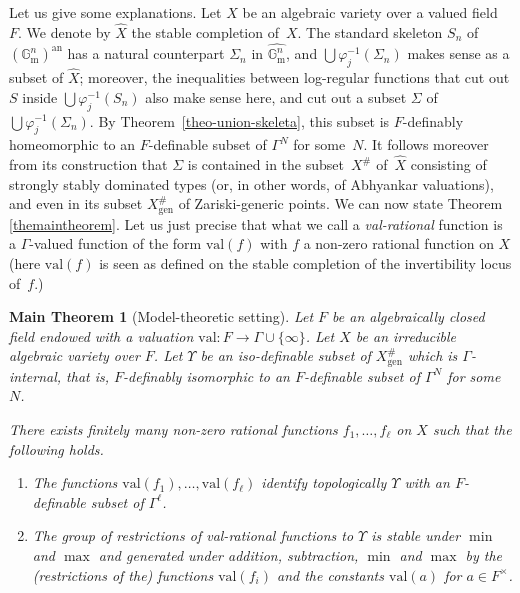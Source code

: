 \documentclass[JEP,XML,SOM,Unicode,ThmDefs,NoEqCountersInSection,published]{cedram}
\newcommand{\an}{^{\mathrm{an}}}
\newcommand{\val}{\mathrm{val}}
\newcommand{\gm}{\bG_{\mathrm m}}
\newcommand{\bG}{\mathbb G}
\let\phi\varphi
\theoremstyle{plain}
\newtheorem*{mtheo}{Main Theorem}
\theoremstyle{definition}
\begin{document}
Let us give some explanations. Let $X$ be an algebraic variety over a valued field~$F$.
We denote by $\widehat X$ the stable completion
of~$X$. The standard skeleton $S_n$ of $(\gm^n)\an$
has a natural counterpart $\Sigma_n$
in $\widehat{\gm^n}$,
and $\bigcup \phi_j^{-1}(\Sigma_n)$
makes sense as a subset of $\widehat X$;
moreover, the inequalities between log-regular functions
that cut out $S$ inside $\bigcup \phi_j^{-1}(S_n)$ also
make sense here, and cut out a subset $\Sigma$ of
$\bigcup \phi_j^{-1}(\Sigma_n)$.
By Theorem~\ref{theo-union-skeleta}, this subset is
$F$-definably homeomorphic to
an $F$-definable subset of $\Gamma^N$
for some~$N$. It follows moreover from its construction
that $\Sigma$ is contained in the subset~$X^\#$ of~$\widehat X$
consisting of strongly stably dominated types (or, in other words,
of Abhyankar valuations), and even in
its subset $X^{\#}_{\mathrm{gen}}$ of Zariski-generic points.
We can now state Theorem \ref{themaintheorem}.
Let us just precise that
what we call a \textit{val-rational} function
is
a $\Gamma$-valued function of the form $\val (f)$ with $f$ a non-zero rational function on $X$ (here $\val(f)$ is seen as
defined on the stable completion of the invertibility locus of~$f$.)

\begin{mtheo}[Model-theoretic setting]
Let $F$ be an algebraically
closed field endowed with a
valuation
$\val: F \to \Gamma \cup \{\infty\}$. Let $X$ be an irreducible algebraic variety
over $F$. Let $\Upsilon$ be an iso-definable
subset of $X^{\#}_{\mathrm{gen}}$ which is $\Gamma$-internal, that is,
$F$-definably isomorphic to an $F$-definable
subset
of $\Gamma^N$ for some $N$.

There exists finitely many non-zero rational functions
$f_1,\ldots, f_\ell$ on $X$ such that the following holds.

\begin{enumerate}
\item\label{enum:mt1} The functions $\val (f_1),\ldots, \val ({f_\ell})$ identify
topologically $\Upsilon$
with an $F$-definable subset of $\Gamma^\ell$.

\item\label{enum:mt2} The group of restrictions of val-rational functions to $\Upsilon$
is stable under $\min$ and $\max$ and generated
under addition, subtraction, $\min$ and $\max$ by the (restrictions of the) functions $\val (f_i)$ and the constants $\val (a)$ for
$a\in F^\times$.
\end{enumerate}
\end{mtheo}
\end{document}
